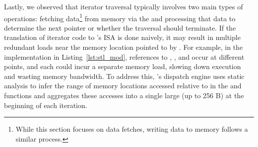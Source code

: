 Lastly, we observed that iterator traversal typically involves two main types of operations: fetching data\footnote{While this section focuses on data fetches, writing data to memory follows a similar process.} from memory via the  and processing that data to determine the next pointer or whether the traversal should terminate. If the translation of iterator code to \pulse's ISA is done naively, it may result in multiple redundant loads near the memory location pointed to by . For example, in the  implementation in Listing~\ref{lst:stl_mod}, references to , , and  occur at different points, and each could incur a separate memory load, slowing down execution and wasting memory bandwidth. To address this, \pulse's dispatch engine uses static analysis to infer the range of memory locations accessed relative to  in the  and  functions and aggregates these accesses into a single large  (up to 256 B) at the beginning of each iteration.


